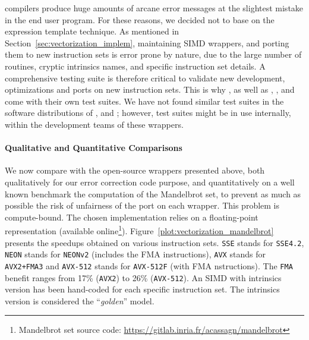 compilers produce huge amounts of arcane error messages at the slightest mistake
in the end user program. For these reasons, we decided not to base \MIPP on the
expression template technique. As mentioned in
Section~\ref{sec:vectorization_implem}, maintaining SIMD wrappers, and porting
them to new instruction sets is error prone by nature, due to the large number
of routines, cryptic intrinsics names, and specific instruction set details. A
comprehensive testing suite is therefore critical to validate new development,
optimizations and ports on new instruction sets. This is why \MIPP, as well as
\Vc, \BoostSIMD, \simdpp and \bSIMD come with their own test suites. We have not
found similar test suites in the software distributions of \VCL, \xsimd and
\TSIMD; however, test suites might be in use internally, within the development
teams of these wrappers.

\paragraph{Qualitative and Quantitative Comparisons}

We now compare \MIPP with the open-source wrappers presented above, both
qualitatively for our error correction code purpose, and quantitatively on a
well known benchmark the computation of the Mandelbrot set, to prevent as much
as possible the risk of unfairness of the port on each wrapper. This problem is
compute-bound. The chosen implementation relies on a floating-point
representation (available online\footnote{Mandelbrot set source code:
\url{https://gitlab.inria.fr/acassagn/mandelbrot}}).
Figure~\ref{plot:vectorization_mandelbrot} presents the speedups obtained on
various instruction sets. \verb|SSE| stands for \verb|SSE4.2|, \verb|NEON|
stands for \verb|NEONv2| (includes the FMA instructions), \verb|AVX| stands for
\verb|AVX2+FMA3| and \verb|AVX-512| stands for \verb|AVX-512F| (with FMA
nstructions). The \verb|FMA| benefit ranges from 17\% (\verb|AVX2|) to 26\%
(\verb|AVX-512|). An SIMD with intrinsics version has been hand-coded for each
specific instruction set. The intrinsics version is considered the
``\emph{golden}'' model.

